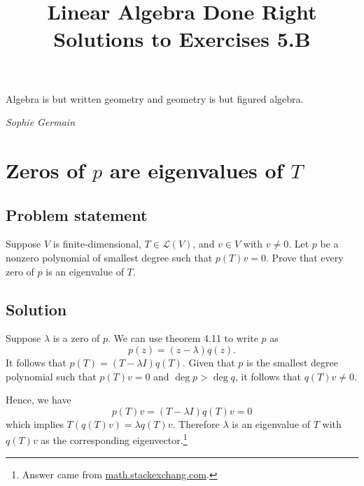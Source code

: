 \documentclass{article}
\title{Linear Algebra Done Right\\Solutions to Exercises 5.B}
\author{}
\date{}
\begin{document}
\maketitle

\epigraph{Algebra is but written geometry and geometry is but figured algebra.}{\textit{Sophie Germain}}

\renewcommand{\thesection}{9}
\section{Zeros of $p$ are eigenvalues of $T$}
\subsection*{Problem statement}
Suppose $V$ is finite-dimensional, $T\in \mathcal{L}(V)$, and $v\in V$ with $v\neq 0$. Let $p$ be a nonzero polynomial of smallest degree such that $p(T)v=0$. Prove that every zero of $p$ is an eigenvalue of $T$.

\subsection*{Solution}
Suppose $\lambda$ is a zero of $p$. We can use theorem 4.11 to write $p$ as 
\[p(z)=(z-\lambda)q(z).\] 
It follows that $p(T)=(T-\lambda I)q(T)$. Given that $p$ is the smallest degree polynomial such that $p(T)v=0$ and $\operatorname{deg}p>\operatorname{deg}q$, it follows that $q(T)v\neq 0$. 

Hence, we have
\[p(T)v=(T-\lambda I)q(T)v=0\]
which implies $T(q(T)v)=\lambda q(T)v$. Therefore $\lambda$ is an eigenvalue of $T$ with $q(T)v$ as the corresponding eigenvector.\footnote{Answer came from \href{https://math.stackexchange.com/questions/4695496/linear-algebra-done-right-exercise-5-b-9-solution-verification}{math.stackexchang.com}.}
\end{document}
